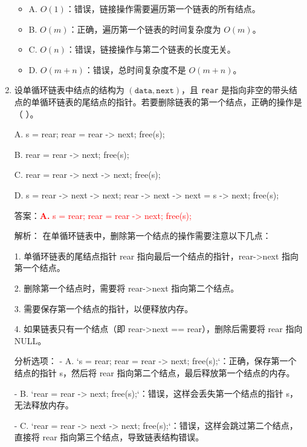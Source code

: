 \documentclass[lang=cn,newtx,10pt,scheme=chinese]{../../../elegantbook}
\begin{document}
\begin{enumerate}
        \begin{itemize}
            \item A. $O(1)$：错误，链接操作需要遍历第一个链表的所有结点。
            \item B. $O(m)$：正确，遍历第一个链表的时间复杂度为 $O(m)$。
            \item C. $O(n)$：错误，链接操作与第二个链表的长度无关。
            \item D. $O(m+n)$：错误，总时间复杂度不是 $O(m+n)$。
        \end{itemize}

        \item 设单循环链表中结点的结构为 $(\texttt{data}, \texttt{next})$，且 \texttt{rear} 是指向非空的带头结点的单循环链表的尾结点的指针。若要删除链表的第一个结点，正确的操作是（ ）。  
    
        A. s = rear; rear = rear -> next; free(s);
    
        B. rear = rear -> next; free(s);
    
        C. rear = rear -> next -> next; free(s);
    
        D. s = rear -> next -> next; rear -> next -> next = s -> next; free(s);

        答案：\textcolor{red}{\textbf{A.} s = rear; rear = rear -> next; free(s);}

        解析：
        在单循环链表中，删除第一个结点的操作需要注意以下几点：

        1. 单循环链表的尾结点指针 rear 指向最后一个结点的指针，rear->next 指向第一个结点。

        2. 删除第一个结点时，需要将 rear->next 指向第二个结点。

        3. 需要保存第一个结点的指针，以便释放内存。

        4. 如果链表只有一个结点（即 rear->next == rear），删除后需要将 rear 指向 NULL。

        分析选项：
        - A. `s = rear; rear = rear -> next; free(s);`：正确，保存第一个结点的指针 s，然后将 rear 指向第二个结点，最后释放第一个结点的内存。

        - B. `rear = rear -> next; free(s);`：错误，这样会丢失第一个结点的指针 s，无法释放内存。

        - C. `rear = rear -> next -> next; free(s);`：错误，这样会跳过第二个结点，直接将 rear 指向第三个结点，导致链表结构错误。


\end{enumerate}
\end{document}

